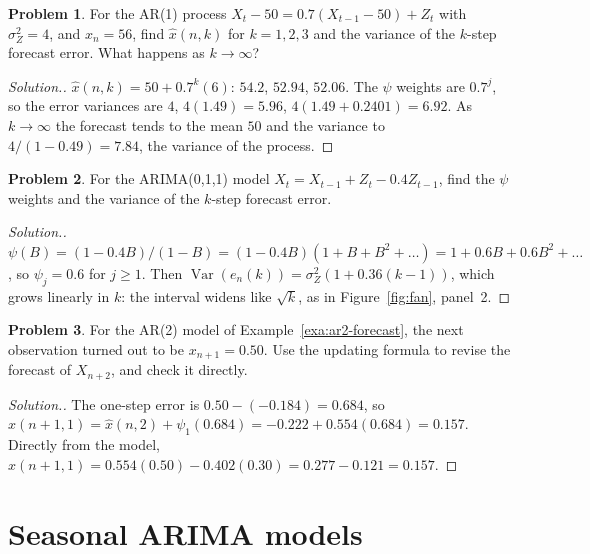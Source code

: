 \documentclass[11pt,a4paper]{article}
\theoremstyle{definition}
\newtheorem{problemx}{Problem}[subsection]
\newenvironment{problem}{\begin{problemx}}{\end{problemx}}
\newenvironment{solution}
  {\renewcommand{\qedsymbol}{}\begin{proof}[\textit{Solution}.]}
  {\end{proof}}
\DeclareMathOperator{\Var}{Var}
\begin{document}
\begin{problem}\label{prob:ar1-forecast}
For the AR(1) process $X_t - 50 = 0.7(X_{t-1} - 50) + Z_t$ with $\sigma_Z^2 = 4$, and $x_n = 56$, find $\hat x(n, k)$ for $k = 1, 2, 3$ and the variance of
the $k$-step forecast error. What happens as $k \to \infty$?
\end{problem}

\begin{solution}
$\hat x(n, k) = 50 + 0.7^k(6)$: $54.2$, $52.94$, $52.06$. The $\psi$ weights are $0.7^j$, so the error variances are $4$, $4(1.49) = 5.96$, $4(1.49 + 0.2401) = 6.92$. As
$k \to \infty$ the forecast tends to the mean $50$ and the variance to $4/(1 - 0.49) = 7.84$, the variance of the process.
\end{solution}

\begin{problem}\label{prob:arima011-var}
For the ARIMA(0,1,1) model $X_t = X_{t-1} + Z_t - 0.4Z_{t-1}$, find the $\psi$ weights and the variance of the $k$-step forecast error.
\end{problem}

\begin{solution}
$\psi(B) = (1 - 0.4B)/(1 - B) = (1 - 0.4B)(1 + B + B^2 + \dots) = 1 + 0.6B + 0.6B^2 + \dots$, so $\psi_j = 0.6$ for $j \ge 1$. Then
$\Var(e_n(k)) = \sigma_Z^2(1 + 0.36(k - 1))$, which grows linearly in $k$: the interval widens like $\sqrt k$, as in Figure~\ref{fig:fan}, panel~2.
\end{solution}

\begin{problem}\label{prob:update}
For the AR(2) model of Example~\ref{exa:ar2-forecast}, the next observation turned out to be $x_{n+1} = 0.50$. Use the updating formula to
revise the forecast of $X_{n+2}$, and check it directly.
\end{problem}

\begin{solution}
The one-step error is $0.50 - (-0.184) = 0.684$, so $\hat x(n + 1, 1) = \hat x(n, 2) + \psi_1(0.684) = -0.222 + 0.554(0.684) = 0.157$. Directly from the model,
$\hat x(n + 1, 1) = 0.554(0.50) - 0.402(0.30) = 0.277 - 0.121 = 0.157$.
\end{solution}

\section{Seasonal ARIMA models}\label{sec:sarima}
\end{document}
